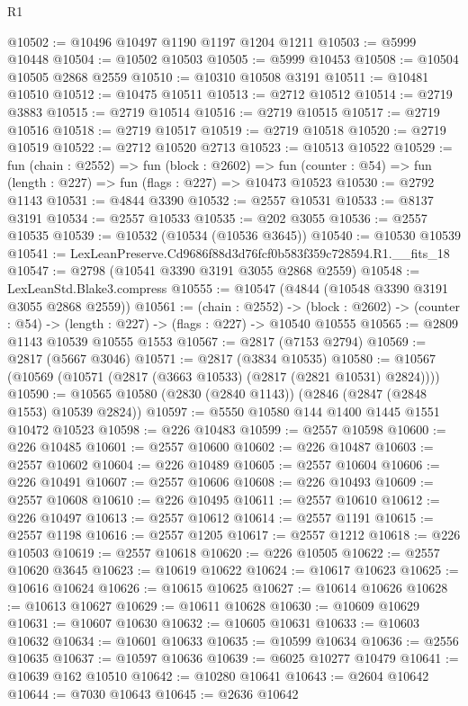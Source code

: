 \begin{lexlean}{R1}
\begin{coremodule}
@10502 := @10496 @10497 @1190 @1197 @1204 @1211
@10503 := @5999 @10448
@10504 := @10502 @10503
@10505 := @5999 @10453
@10508 := @10504 @10505 @2868 @2559
@10510 := @10310 @10508 @3191
@10511 := @10481 @10510
@10512 := @10475 @10511
@10513 := @2712 @10512
@10514 := @2719 @3883
@10515 := @2719 @10514
@10516 := @2719 @10515
@10517 := @2719 @10516
@10518 := @2719 @10517
@10519 := @2719 @10518
@10520 := @2719 @10519
@10522 := @2712 @10520 @2713
@10523 := @10513 @10522
@10529 := fun (chain : @2552) =>
  fun (block : @2602) =>
  fun (counter : @54) => fun (length : @227) => fun (flags : @227) => @10473 @10523
@10530 := @2792 @1143
@10531 := @4844 @3390
@10532 := @2557 @10531
@10533 := @8137 @3191
@10534 := @2557 @10533
@10535 := @202 @3055
@10536 := @2557 @10535
@10539 := @10532 (@10534 (@10536 @3645))
@10540 := @10530 @10539
@10541 := LexLeanPreserve.Cd9686f88d3d76fcf0b583f359c728594.R1.__fits_18
@10547 := @2798 (@10541 @3390 @3191 @3055 @2868 @2559)
@10548 := LexLeanStd.Blake3.compress
@10555 := @10547 (@4844 (@10548 @3390 @3191 @3055 @2868 @2559))
@10561 := (chain : @2552) ->
  (block : @2602) -> (counter : @54) -> (length : @227) -> (flags : @227) -> @10540 @10555
@10565 := @2809 @1143 @10539 @10555 @1553
@10567 := @2817 (@7153 @2794)
@10569 := @2817 (@5667 @3046)
@10571 := @2817 (@3834 @10535)
@10580 := @10567 (@10569 (@10571 (@2817 (@3663 @10533) (@2817 (@2821 @10531) @2824))))
@10590 := @10565 @10580 (@2830 (@2840 @1143)) (@2846 (@2847 (@2848 @1553) @10539 @2824))
@10597 := @5550 @10580 @144 @1400 @1445 @1551 @10472 @10523
@10598 := @226 @10483
@10599 := @2557 @10598
@10600 := @226 @10485
@10601 := @2557 @10600
@10602 := @226 @10487
@10603 := @2557 @10602
@10604 := @226 @10489
@10605 := @2557 @10604
@10606 := @226 @10491
@10607 := @2557 @10606
@10608 := @226 @10493
@10609 := @2557 @10608
@10610 := @226 @10495
@10611 := @2557 @10610
@10612 := @226 @10497
@10613 := @2557 @10612
@10614 := @2557 @1191
@10615 := @2557 @1198
@10616 := @2557 @1205
@10617 := @2557 @1212
@10618 := @226 @10503
@10619 := @2557 @10618
@10620 := @226 @10505
@10622 := @2557 @10620 @3645
@10623 := @10619 @10622
@10624 := @10617 @10623
@10625 := @10616 @10624
@10626 := @10615 @10625
@10627 := @10614 @10626
@10628 := @10613 @10627
@10629 := @10611 @10628
@10630 := @10609 @10629
@10631 := @10607 @10630
@10632 := @10605 @10631
@10633 := @10603 @10632
@10634 := @10601 @10633
@10635 := @10599 @10634
@10636 := @2556 @10635
@10637 := @10597 @10636
@10639 := @6025 @10277 @10479
@10641 := @10639 @162 @10510
@10642 := @10280 @10641
@10643 := @2604 @10642
@10644 := @7030 @10643
@10645 := @2636 @10642

\end{coremodule}
\end{lexlean}
